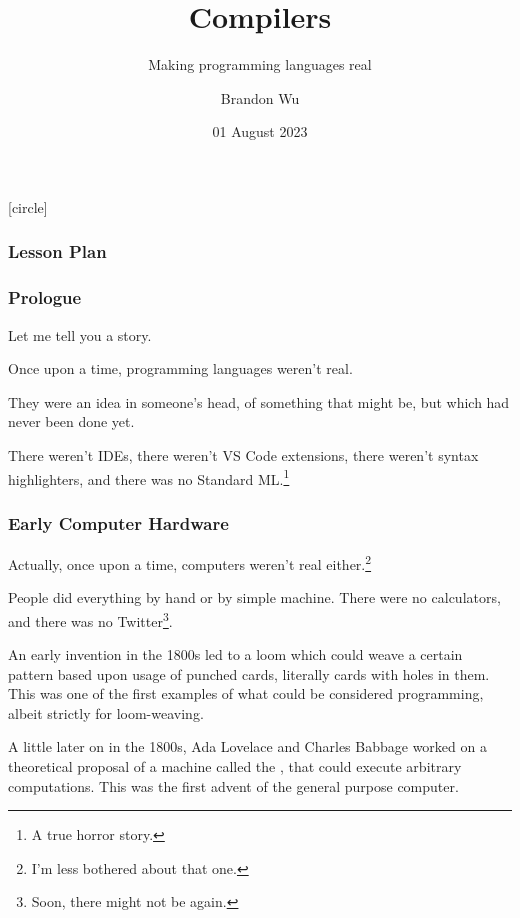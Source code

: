 \documentclass[aspectratio=169]{beamer}
\title{Compilers} %
\subtitle{Making programming languages real} %
\date{01 August 2023} %
\author{Brandon Wu} %
\newif\ifcolorlambda
\begin{document}
\ifweb
    \renewcommand{\pause}{}
\fi

[circle]

{
\begin{frame}[plain]
    \colorlambdatrue
    \titlepage
\end{frame}
}

\begin{frame}[fragile]
  \frametitle{Lesson Plan}

  \tableofcontents
\end{frame}


\begin{frame}[fragile]
  \frametitle{Prologue}

  Let me tell you a story.

  \vspace{\fill}

  Once upon a time, programming languages weren't real.

  \vspace{\fill}

  They were an idea in someone's head, of something that might be, but
  which had never been done yet.

  \pause
  \vspace{\fill}

  There weren't IDEs, there weren't VS Code extensions, there weren't
  syntax highlighters, and there was no Standard ML.\footnote<2->{A true horror story.}
\end{frame}

\begin{frame}[fragile]
  \frametitle{Early Computer Hardware}

  Actually, once upon a time, computers weren't real either.\footnote<2->{I'm less bothered about that one.}

  \vspace{\fill}

  People did everything by hand or by simple machine. There were no calculators,
  and there was no Twitter\footnote<3->{Soon, there might not be again.}.

  \vspace{\fill}

  An early invention in the 1800s led to a loom which could weave a certain pattern
  based upon usage of punched cards, literally cards with holes in them. This was
  one of the first examples of what could be considered programming, albeit
  strictly for loom-weaving.

  \vspace{\fill}

  A little later on in the 1800s, Ada Lovelace and Charles Babbage worked on a
  theoretical proposal of a machine called the , that
  could execute arbitrary computations. This was the first advent of the general
  purpose computer.
\end{frame}
\end{document}
